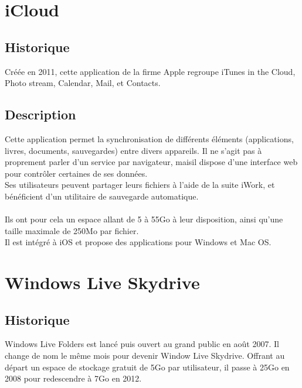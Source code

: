 \section{iCloud}

\subsection{Historique}
Créée en 2011, cette application de la firme Apple regroupe iTunes in the Cloud, Photo stream, Calendar, Mail, et Contacts.

\subsection{Description}
Cette application permet la synchronisation de différents éléments (applications, livres, documents, sauvegardes) entre divers appareils. Il ne s'agit pas à proprement parler d'un service par navigateur, maisil dispose d'une interface web pour contrôler certaines de ses données.\\
Ses utilisateurs peuvent partager leurs fichiers à l'aide de la suite iWork, et bénéficient d'un utilitaire de sauvegarde automatique.\\
\\
Ils ont pour cela un espace allant de 5 à 55Go à leur disposition, ainsi qu'une taille maximale de 250Mo par fichier.\\
Il est intégré à iOS et propose des applications pour Windows et Mac OS.\\


\section{Windows Live Skydrive}

\subsection{Historique}
Windows Live Folders est lancé puis ouvert au grand public en août 2007. Il change de nom le même mois pour devenir Window Live Skydrive. Offrant au départ un espace de stockage gratuit de 5Go par utilisateur, il passe à 25Go en 2008 pour redescendre à 7Go en 2012.\\

